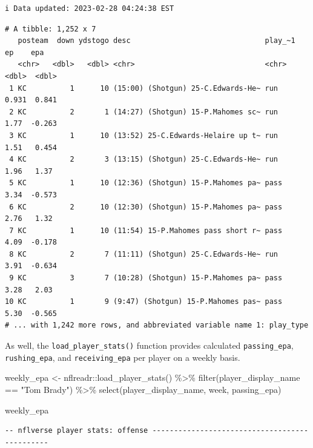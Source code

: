 \documentclass[
  letterpaper,
]{krantz}
\newenvironment{Shaded}{\begin{snugshade}}{\end{snugshade}}
\newcommand{\FunctionTok}[1]{\textcolor[rgb]{0.28,0.35,0.67}{#1}}
\newcommand{\NormalTok}[1]{\textcolor[rgb]{0.00,0.23,0.31}{#1}}
\newcommand{\OtherTok}[1]{\textcolor[rgb]{0.00,0.23,0.31}{#1}}
\newcommand{\SpecialCharTok}[1]{\textcolor[rgb]{0.37,0.37,0.37}{#1}}
\newcommand{\StringTok}[1]{\textcolor[rgb]{0.13,0.47,0.30}{#1}}
\begin{document}
\begin{verbatim}
i Data updated: 2023-02-28 04:24:38 EST
\end{verbatim}

\begin{verbatim}
# A tibble: 1,252 x 7
   posteam  down ydstogo desc                               play_~1    ep    epa
   <chr>   <dbl>   <dbl> <chr>                              <chr>   <dbl>  <dbl>
 1 KC          1      10 (15:00) (Shotgun) 25-C.Edwards-He~ run     0.931  0.841
 2 KC          2       1 (14:27) (Shotgun) 15-P.Mahomes sc~ run     1.77  -0.263
 3 KC          1      10 (13:52) 25-C.Edwards-Helaire up t~ run     1.51   0.454
 4 KC          2       3 (13:15) (Shotgun) 25-C.Edwards-He~ run     1.96   1.37 
 5 KC          1      10 (12:36) (Shotgun) 15-P.Mahomes pa~ pass    3.34  -0.573
 6 KC          2      10 (12:30) (Shotgun) 15-P.Mahomes pa~ pass    2.76   1.32 
 7 KC          1      10 (11:54) 15-P.Mahomes pass short r~ pass    4.09  -0.178
 8 KC          2       7 (11:11) (Shotgun) 25-C.Edwards-He~ run     3.91  -0.634
 9 KC          3       7 (10:28) (Shotgun) 15-P.Mahomes pa~ pass    3.28   2.03 
10 KC          1       9 (9:47) (Shotgun) 15-P.Mahomes pas~ pass    5.30  -0.565
# ... with 1,242 more rows, and abbreviated variable name 1: play_type
\end{verbatim}

As well, the \texttt{load\_player\_stats()} function provides calculated
\texttt{passing\_epa}, \texttt{rushing\_epa}, and
\texttt{receiving\_epa} per player on a weekly basis.

\begin{Shaded}
\begin{Highlighting}[]
\NormalTok{weekly\_epa }\OtherTok{\textless{}{-}}\NormalTok{ nflreadr}\SpecialCharTok{::}\FunctionTok{load\_player\_stats}\NormalTok{() }\SpecialCharTok{\%\textgreater{}\%}
  \FunctionTok{filter}\NormalTok{(player\_display\_name }\SpecialCharTok{==} \StringTok{"Tom Brady"}\NormalTok{) }\SpecialCharTok{\%\textgreater{}\%}
  \FunctionTok{select}\NormalTok{(player\_display\_name, week, passing\_epa)}

\NormalTok{weekly\_epa}
\end{Highlighting}
\end{Shaded}

\begin{verbatim}
-- nflverse player stats: offense ----------------------------------------------
\end{verbatim}
\end{document}
